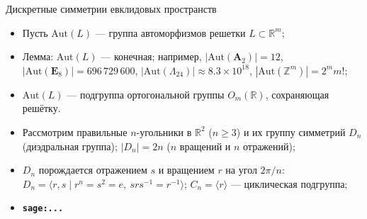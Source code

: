 \documentclass[serif, aspectratio=169]{beamer}
\newcommand{\sagemark}{%
  \textcolor{green!40!black}{\textbf{\texttt{sage:...}}}%
}
\begin{document}
\begin{frame}{Дискретные симметрии евклидовых пространств}
    \begin{itemize}
        \item Пусть $\mathrm{Aut}(L)$ --- группа автоморфизмов решетки $L\subset\mathbb{R}^m$;
        \item Лемма: $\mathrm{Aut}(L)$ --- конечная; например, 
        $|\mathrm{Aut}(\mathbf{A}_2)|=12$, $|\mathrm{Aut}(\mathbf{E}_8)|=696\,729\,600$, $|\mathrm{Aut}(\Lambda_{24})|\approx8.3\times10^{18}$, $|\mathrm{Aut}(\mathbb{Z}^m)|=2^m m!$;
        \item $\mathrm{Aut}(L)$ --- подгруппа ортогональной группы $O_m(\mathbb{R})$, сохраняющая решётку.
        \item Рассмотрим правильные $n$-угольники в $\mathbb{R}^2$ ($n\ge3$) и их группу симметрий $D_n$ (диэдральная группа); $|D_n|=2n$ ($n$ вращений и $n$ отражений);
        \item $D_n$ порождается отражением $s$ и вращением $r$ на угол $2\pi/n$: $D_n=\langle r,s\mid r^n=s^2=e,\ srs^{-1}=r^{-1}\rangle$; $C_n=\langle r\rangle$ --- циклическая подгруппа;
        \begin{center}
        \end{center}
        \item \sagemark
    \end{itemize}
\end{frame}
\end{document}
